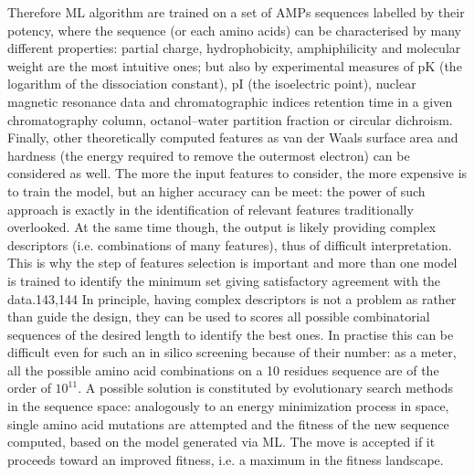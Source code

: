 Therefore ML algorithm are trained on a set of AMPs sequences labelled by their potency, where the sequence (or each amino acids) can be characterised by many different properties: partial charge, hydrophobicity, amphiphilicity and molecular weight are the most intuitive ones; but also by experimental measures of pK (the logarithm of the dissociation constant), pI (the isoelectric point), nuclear magnetic resonance data and chromatographic indices retention time in a given chromatography column, octanol–water partition fraction or circular dichroism. Finally, other theoretically computed features as van der Waals surface area and hardness (the energy required to remove the outermost electron) can be considered as well.
%
The more the input features to consider, the more expensive is to train the model, but an higher accuracy can be meet: the power of such approach is exactly in the identification of relevant features traditionally overlooked. At the same time though, the output is likely providing complex descriptors (i.e. combinations of many features), thus of difficult interpretation. This is why the step of features selection is important and more than one model is trained to identify the minimum set giving satisfactory agreement with the data.143,144
%
In principle, having complex descriptors is not a problem as rather than guide the design, they can be used to scores all possible combinatorial sequences of the desired length to identify the best ones. In practise this can be difficult even for such an in silico screening because of their number: as a meter, all the possible amino acid combinations on a 10 residues sequence are of the order of $10^{11}$.
%
A possible solution is constituted by evolutionary search methods in the sequence space: analogously to an energy minimization process in space, single amino acid mutations are attempted and the fitness of the new sequence computed, based on the model generated via ML. The move is accepted if it proceeds toward an improved fitness, i.e. a maximum in the fitness landscape.

